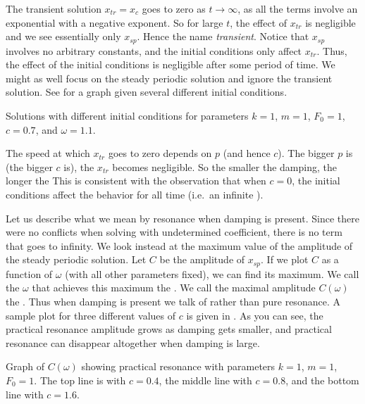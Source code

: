 The transient solution $x_{tr} = x_c$ goes to zero as $t \to \infty$,
as all the terms involve an exponential with a negative exponent.  So
for large $t$, the effect of $x_{tr}$ is negligible and we see essentially
only $x_{sp}$.
Hence the name \emph{transient}.
Notice that $x_{sp}$ involves no arbitrary constants, and
the initial conditions only affect $x_{tr}$.  Thus, the effect
of the initial conditions is negligible after some period of time.
We might as well focus on the
steady periodic solution and ignore the transient solution.  See
 for a graph given several different initial conditions.

\begin{mywrapfig}{3.25in}
\capstart
{}
\caption{Solutions with different initial conditions for parameters
$k=1$, $m=1$, $F_0 = 1$, $c=0.7$, and $\omega=1.1$.\label{3.6:transbehfig}}
\end{mywrapfig}

The speed at which $x_{tr}$ goes to zero depends on $p$ (and
hence $c$).  The
bigger $p$ is (the bigger $c$ is), the  $x_{tr}$ becomes negligible. 
So the smaller the damping, the longer the 
This is consistent
with the observation that when $c=0$, the initial conditions affect the
behavior for all time (i.e.\ an infinite ).

\medskip

Let us describe what we mean by resonance when damping is present.
Since there were no conflicts when solving with undetermined coefficient,
there is no term that goes to infinity.  We look instead at the
maximum value of the amplitude of the steady periodic solution.
Let $C$ be the amplitude of $x_{sp}$.
If we plot $C$ as a function of $\omega$ (with all other
parameters fixed), we can find its maximum.
We call the $\omega$ that achieves this maximum
the \emph{}.
We call the maximal amplitude $C(\omega)$
the \emph{}.
Thus when damping is present we talk of \emph{}
rather than pure resonance.
A sample plot for three different
values of $c$ is given in .  As you can see, the
practical resonance amplitude grows as damping gets smaller, and 
practical resonance can disappear altogether when damping is large.

\begin{myfig}
\capstart
{}
\caption{Graph of $C(\omega)$ showing practical resonance with parameters
$k=1$, $m=1$, $F_0 = 1$. The top line is with $c=0.4$, the middle line with
$c=0.8$, and the bottom line with
$c=1.6$.\label{3.6:pracresfig}}
\end{myfig}

